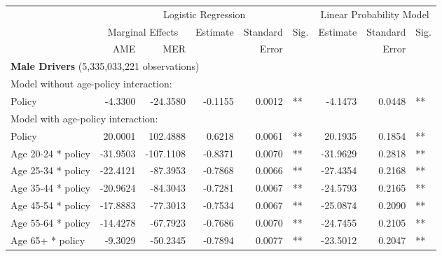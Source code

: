 
\begin{table}%
\centering 
\begin{tabular}{l r r r r l r r l} 

\hline 
 
 & \multicolumn{5}{c}{Logistic Regression}  & \multicolumn{3}{c}{Linear Probability Model} \\ 

 \cmidrule(lr){2-6}\cmidrule(lr){7-9} 
 & \multicolumn{2}{c}{Marginal Effects} & Estimate & Standard & Sig. & Estimate & Standard & Sig. \\ 

 \cmidrule(lr){2-3} 
 &   AME &  MER  &          &  Error   &      &          &  Error   &     \\ 

\hline 
 
\multicolumn{8}{l}{\textbf{Male Drivers} (5,335,033,221 observations)} \\ 

\hline
\multicolumn{8}{l}{Model without age-policy interaction: } \\ 
Policy                   &  -4.3300        &  -24.3580       &  -0.1155        &  0.0012       &   **       &  -4.1473        &  0.0448       &   **       \\ 
\hline
\multicolumn{8}{l}{Model with age-policy interaction: } \\ 
Policy                   &  20.0001        &  102.4888       &  0.6218        &  0.0061       &   **       &  20.1935        &  0.1854       &   **       \\ 
Age 20-24 * policy   &  -31.9503        &  -107.1108       &  -0.8371        &  0.0070       &   **       &  -31.9629        &  0.2818       &   **       \\ 
Age 25-34 * policy   &  -22.4121        &  -87.3953       &  -0.7868        &  0.0066       &   **       &  -27.4354        &  0.2168       &   **       \\ 
Age 35-44 * policy   &  -20.9624        &  -84.3043       &  -0.7281        &  0.0067       &   **       &  -24.5793        &  0.2165       &   **       \\ 
Age 45-54 * policy   &  -17.8883        &  -77.3013       &  -0.7534        &  0.0067       &   **       &  -25.0874        &  0.2090       &   **       \\ 
Age 55-64 * policy   &  -14.4278        &  -67.7923       &  -0.7686        &  0.0070       &   **       &  -24.7455        &  0.2105       &   **       \\ 
Age 65+ * policy   &  -9.3029        &  -50.2345       &  -0.7894        &  0.0077       &   **       &  -23.5012        &  0.2047       &   **       \\ 


\end{tabular}
\end{table}
